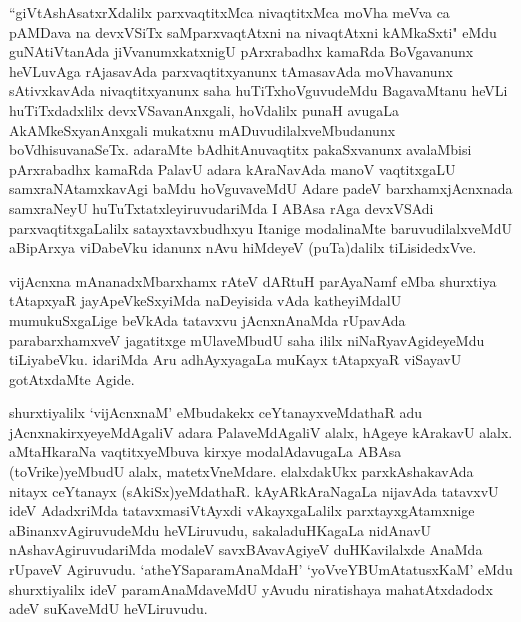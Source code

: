 \begin{artha}
``giVtAshAsatxrXdalilx parxvaqtitxMca nivaqtitxMca moVha meVva ca pAMDava na devxVSiTx saMparxvaqtAtxni na nivaqtAtxni kAMkaSxti" eMdu guNAtiVtanAda jiVvanumxkatxnigU pArxrabadhx kamaRda BoVgavanunx heVLuvAga rAjasavAda parxvaqtitxyanunx tAmasavAda moVhavanunx sAtivxkavAda nivaqtitxyanunx saha huTiTxhoVguvudeMdu BagavaMtanu heVLi huTiTxdadxlilx devxVSavanAnxgali, hoVdalilx punaH avugaLa AkAMkeSxyanAnxgali mukatxnu mADuvudilalxveMbudanunx boVdhisuvanaSeTx. adaraMte bAdhitAnuvaqtitx pakaSxvanunx avalaMbisi pArxrabadhx kamaRda PalavU adara kAraNavAda manoV vaqtitxgaLU samxraNAtamxkavAgi baMdu hoVguvaveMdU Adare padeV barxhamxjAcnxnada samxraNeyU huTuTxtatxleyiruvudariMda I ABAsa rAga devxVSAdi parxvaqtitxgaLalilx satayxtavxbudhxyu Itanige modalinaMte baruvudilalxveMdU aBipArxya viDabeVku idanunx nAvu hiMdeyeV (puTa)dalilx tiLisidedxVve. 
\end{artha}%

\begin{artha}
vijAcnxna mAnanadxMbarxhamx rAteV dARtuH parAyaNamf eMba shurxtiya tAtapxyaR jayApeVkeSxyiMda naDeyisida vAda katheyiMdalU mumukuSxgaLige beVkAda tatavxvu jAcnxnAnaMda rUpavAda parabarxhamxveV jagatitxge mUlaveMbudU saha ililx niNaRyavAgideyeMdu tiLiyabeVku. idariMda Aru adhAyxyagaLa muKayx tAtapxyaR viSayavU gotAtxdaMte Agide. 
\end{artha}

\begin{artha}
shurxtiyalilx `vijAcnxnaM' eMbudakekx ceYtanayxveMdathaR adu jAcnxnakirxyeyeMdAgaliV adara PalaveMdAgaliV alalx, hAgeye kArakavU alalx. aMtaHkaraNa vaqtitxyeMbuva kirxye modalAdavugaLa ABAsa (toVrike)yeMbudU alalx,  	matetxVneMdare. elalxdakUkx parxkAshakavAda nitayx ceYtanayx (sAkiSx)yeMdathaR. kAyARkAraNagaLa nijavAda tatavxvU ideV AdadxriMda tatavxmasiVtAyxdi vAkayxgaLalilx parxtayxgAtamxnige aBinanxvAgiruvudeMdu heVLiruvudu, sakaladuHKagaLa nidAnavU nAshavAgiruvudariMda modaleV savxBAvavAgiyeV duHKavilalxde AnaMda rUpaveV Agiruvudu. `atheYSaparamAnaMdaH' `yoVveYBUmAtatusxKaM' eMdu shurxtiyalilx ideV paramAnaMdaveMdU yAvudu niratishaya mahatAtxdadodx adeV suKaveMdU heVLiruvudu.
\end{artha}%

